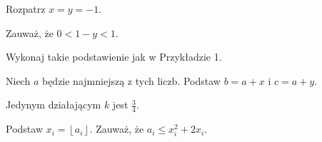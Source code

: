
\begin{hints_list}
	\item Rozpatrz $x = y = -1$.
	\item Zauważ, że $0 < 1 - y < 1$.
	\item Wykonaj takie podstawienie jak w Przykładzie 1.
	\item Niech $a$ będzie najmniejszą z tych liczb. Podstaw $b = a + x$ i $c = a + y$.
	\item Jedynym działającym $k$ jest $\frac{3}{4}$.
	\item Podstaw $x_i = \left\lfloor a_i \right\rfloor$. Zauważ, że $a_i \leqslant x_i^2 + 2x_i$.
\end{hints_list}